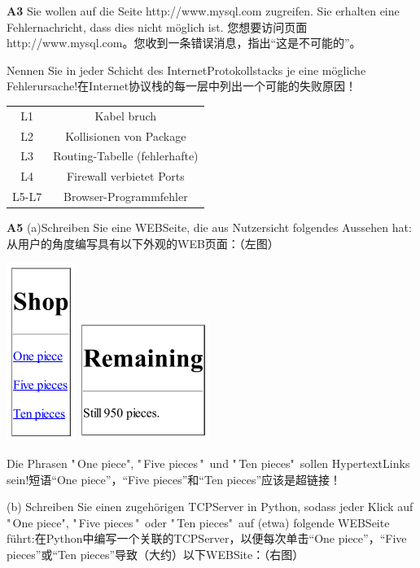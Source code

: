 \documentclass[fleqn]{article}
\begin{document}
\noindent\textbf{A3} Sie wollen auf die Seite http://www.mysql.com zugreifen. Sie erhalten eine Fehlernachricht, dass dies nicht möglich ist.
您想要访问页面http://www.mysql.com。您收到一条错误消息，指出“这是不可能的”。

Nennen Sie in jeder Schicht des Internet­Protokollstacks je eine mögliche Fehlerursache!在Internet协议栈的每一层中列出一个可能的失败原因！

\begin{tabular}{c|c}
    L1&Kabel bruch\\
    L2&Kollisionen von Package\\
    L3&Routing-Tabelle (fehlerhafte)\\
    L4&Firewall verbietet Ports\\
    L5-L7&Browser-Programmfehler 
\end{tabular}

\noindent\textbf{A5} (a)Schreiben Sie eine WEB­Seite, die aus Nutzersicht folgendes Aussehen hat:从用户的角度编写具有以下外观的WEB页面：（左图）

\includegraphics[]{bild4.png}\qquad
\includegraphics[]{bild5.png}

Die Phrasen "\,One piece", "\,Five pieces\,"\, und "\,Ten pieces"\, sollen Hypertext­Links sein!短语“One piece”，“Five pieces”和“Ten pieces”应该是超链接！

(b) Schreiben Sie einen zugehörigen TCP­Server in Python, sodass jeder Klick auf "\,One piece", "\,Five pieces\,"\, oder "\,Ten pieces"\, auf (etwa) folgende WEB­Seite führt:在Python中编写一个关联的TCPServer，以便每次单击“One piece”，“Five pieces”或“Ten pieces”导致（大约）以下WEBSite：（右图）
\end{document}
